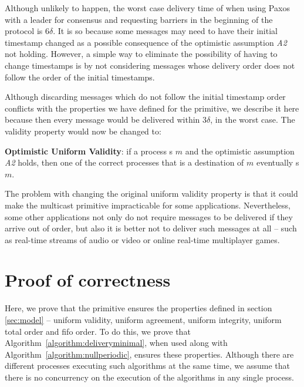 \documentclass[times, 10pt]{article}
\begin{document}
Although unlikely to happen, the worst case delivery time of \amcast{} when using Paxos with a leader for consensus and requesting barriers in the beginning of the protocol is $6\delta$. It is so because some messages may need to have their initial timestamp changed as a possible consequence of the optimistic assumption \emph{A2} not holding. However, a simple way to eliminate the possibility of having to change timestamps is by not considering messages whose delivery order does not follow the order of the initial timestamps.

Although discarding messages which do not follow the initial timestamp order conflicts with the properties we have defined for the \amcast{} primitive, we describe it here because then every message would be delivered within $3\delta$, in the worst case. The validity property would now be changed to:

\textbf{Optimistic Uniform Validity}: if a process \amcast{}s $m$ and the optimistic assumption \emph{A2} holds, then one of the correct processes that is a destination of $m$ eventually \cons{}s $m$.

The problem with changing the original uniform validity property is that it could make the multicast primitive impracticable for some applications. Nevertheless, some other applications not only do not require messages to be delivered if they arrive out of order, but also it is better not to deliver such messages at all -- such as real-time streams of audio or video or online real-time multiplayer games.






\section{Proof of correctness}
\label{sec:proofs}

Here, we prove that the \amcast{} primitive ensures the properties defined in section \ref{sec:model} -- uniform validity, uniform agreement, uniform integrity, uniform total order and fifo order. To do this, we prove that \mbox{Algorithm \ref{algorithm:deliveryminimal}}, when used along with \mbox{Algorithm \ref{algorithm:nullperiodic}}, ensures these properties. Although there are different processes executing such algorithms at the same time, we assume that there is no concurrency on the execution of the algorithms in any single process.
\end{document}
